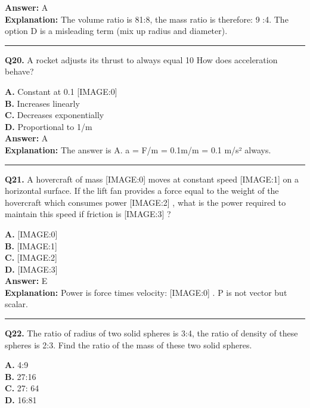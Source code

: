 \documentclass[12pt]{article}
\begin{document}
\textbf{Answer:} A \\
\textbf{Explanation:} The volume ratio is 81:8, the mass ratio is therefore: 9 :4. The option D is a misleading term (mix up radius and diameter).

\hrule
\vspace{1em}


\noindent
\textbf{Q20.} A rocket adjusts its thrust to always equal 10%
How does acceleration behave?



\textbf{A.} Constant at 0.1
[IMAGE:0] \\
\textbf{B.} Increases linearly \\
\textbf{C.} Decreases exponentially \\
\textbf{D.} Proportional to 1/m \\

\textbf{Answer:} A \\
\textbf{Explanation:} The answer is A.
a = F/m = 0.1m/m = 0.1 m/s² always.

\hrule
\vspace{1em}


\noindent
\textbf{Q21.} A hovercraft of mass
[IMAGE:0]
moves at constant speed
[IMAGE:1]
on a horizontal surface. If the lift fan provides a force equal to the weight of the hovercraft which consumes power
[IMAGE:2]
, what is the power required to maintain this speed if friction is
[IMAGE:3]
?



\textbf{A.} [IMAGE:0] \\
\textbf{B.} [IMAGE:1] \\
\textbf{C.} [IMAGE:2] \\
\textbf{D.} [IMAGE:3] \\

\textbf{Answer:} E \\
\textbf{Explanation:} Power is force times velocity:
[IMAGE:0]
. P is not vector but scalar.

\hrule
\vspace{1em}


\noindent
\textbf{Q22.} The ratio of radius of two solid spheres is 3:4, the ratio of density of these spheres is 2:3. Find the ratio of the mass of these two solid spheres.



\textbf{A.} 4:9 \\
\textbf{B.} 27:16 \\
\textbf{C.} 27:
64 \\
\textbf{D.} 16:81 \\
\end{document}
